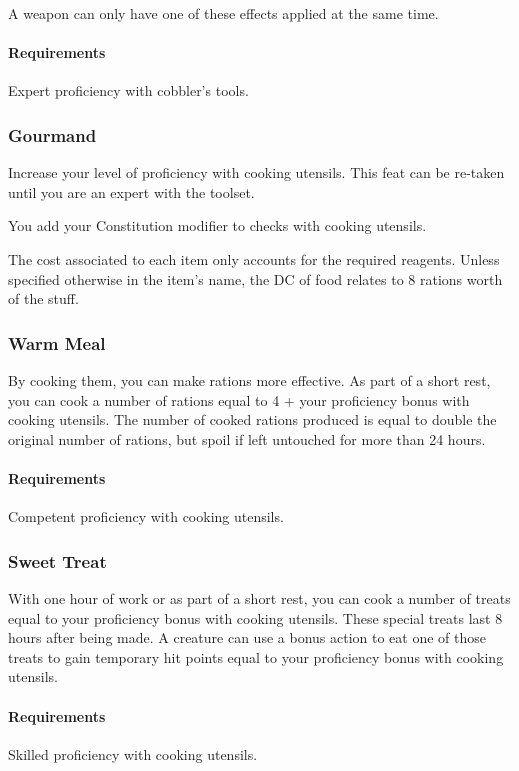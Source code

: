     A weapon can only have one of these effects applied at the same time.
    \paragraph{Requirements} Expert proficiency with cobbler's tools.

\subsubsection{Gourmand} \label{feat::gourmand}
    Increase your level of proficiency with cooking utensils.
    This feat can be re-taken until you are an expert with the toolset.

    You add your Constitution modifier to checks with cooking utensils.

    The cost associated to each item only accounts for the required reagents.
    Unless specified otherwise in the item's name, the DC of food relates to 8 rations worth of the stuff.
\subsubsection{Warm Meal} \label{feat::warmmeal}
    By cooking them, you can make rations more effective.
    As part of a short rest, you can cook a number of rations equal to 4 + your proficiency bonus with cooking utensils.
    The number of cooked rations produced is equal to double the original number of rations, but spoil if left untouched for more than 24 hours.
    \paragraph{Requirements} Competent proficiency with cooking utensils.
\subsubsection{Sweet Treat} \label{feat::sweettreat}
    With one hour of work or as part of a short rest, you can cook a number of treats equal to your proficiency bonus with cooking utensils.
    These special treats last 8 hours after being made.
    A creature can use a bonus action to eat one of those treats to gain temporary hit points equal to your proficiency bonus with cooking utensils.
    \paragraph{Requirements} Skilled proficiency with cooking utensils.

